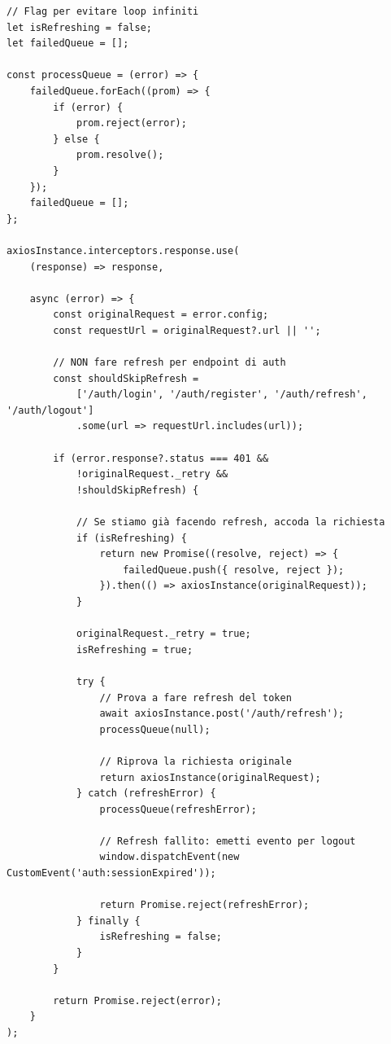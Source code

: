 \documentclass[11pt,a4paper]{article}
\begin{document}
\begin{lstlisting}[caption=Interceptor Refresh Token Automatico]
// Flag per evitare loop infiniti
let isRefreshing = false;
let failedQueue = [];

const processQueue = (error) => {
    failedQueue.forEach((prom) => {
        if (error) {
            prom.reject(error);
        } else {
            prom.resolve();
        }
    });
    failedQueue = [];
};

axiosInstance.interceptors.response.use(
    (response) => response,
    
    async (error) => {
        const originalRequest = error.config;
        const requestUrl = originalRequest?.url || '';

        // NON fare refresh per endpoint di auth
        const shouldSkipRefresh = 
            ['/auth/login', '/auth/register', '/auth/refresh', '/auth/logout']
            .some(url => requestUrl.includes(url));
        
        if (error.response?.status === 401 && 
            !originalRequest._retry && 
            !shouldSkipRefresh) {
            
            // Se stiamo già facendo refresh, accoda la richiesta
            if (isRefreshing) {
                return new Promise((resolve, reject) => {
                    failedQueue.push({ resolve, reject });
                }).then(() => axiosInstance(originalRequest));
            }

            originalRequest._retry = true;
            isRefreshing = true;

            try {
                // Prova a fare refresh del token
                await axiosInstance.post('/auth/refresh');
                processQueue(null);
                
                // Riprova la richiesta originale
                return axiosInstance(originalRequest);
            } catch (refreshError) {
                processQueue(refreshError);
                
                // Refresh fallito: emetti evento per logout
                window.dispatchEvent(new CustomEvent('auth:sessionExpired'));
                
                return Promise.reject(refreshError);
            } finally {
                isRefreshing = false;
            }
        }

        return Promise.reject(error);
    }
);
\end{lstlisting}
\end{document}
